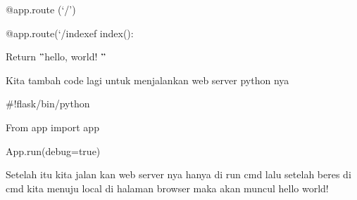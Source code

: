 \documentclass[a4paper,12pt]{report}
\begin{document}
\vspace{14pt}
\noindent 
{\fontsize{14pt}{14pt}\selectfont @app.route (‘/’) \\} \par
\vspace{14pt}
\noindent 
{\fontsize{14pt}{14pt}\selectfont @app.route(‘/indexef index(): \\} \par
\vspace{14pt}
\noindent 
{\fontsize{14pt}{14pt}\selectfont Return  $ " $hello, world! $ " $ \\} \par
\vspace{14pt}
\noindent 
{\fontsize{14pt}{14pt}\selectfont Kita tambah code lagi untuk menjalankan web server python nya \\} \par
\vspace{14pt}
\vspace{14pt}
\noindent 
{\fontsize{14pt}{14pt}\selectfont  $  \#  $!flask/bin/python \\} \par
\noindent 
{\fontsize{14pt}{14pt}\selectfont From app import app \\} \par
\noindent 
{\fontsize{14pt}{14pt}\selectfont App.run(debug=true) \\} \par
\vspace{14pt}
\noindent 
{\fontsize{14pt}{14pt}\selectfont Setelah itu kita jalan kan web server nya hanya di run cmd lalu setelah beres di cmd kita menuju local di halaman browser maka akan muncul hello world! \\} \par
\vspace{14pt}
\vspace{14pt}
\end{document}
